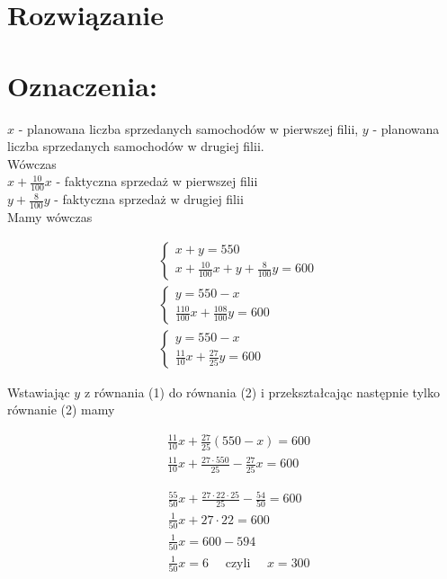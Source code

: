 \documentclass[10pt]{article}
\begin{document}
\section*{Rozwiązanie}
\section*{Oznaczenia:}
\(x\) - planowana liczba sprzedanych samochodów w pierwszej filii, \(y\) - planowana liczba sprzedanych samochodów w drugiej filii.\\
Wówczas\\
\(x+\frac{10}{100} x\) - faktyczna sprzedaż w pierwszej filii\\
\(y+\frac{8}{100} y\) - faktyczna sprzedaż w drugiej filii\\
Mamy wówczas

\[
\begin{aligned}
& \left\{\begin{array}{l}
x+y=550 \\
x+\frac{10}{100} x+y+\frac{8}{100} y=600
\end{array}\right. \\
& \left\{\begin{array}{l}
y=550-x \\
\frac{110}{100} x+\frac{108}{100} y=600
\end{array}\right. \\
& \left\{\begin{array}{l}
y=550-x \\
\frac{11}{10} x+\frac{27}{25} y=600
\end{array}\right.
\end{aligned}
\]

Wstawiając \(y\) z równania (1) do równania (2) i przekształcając następnie tylko równanie (2) mamy

\[
\begin{aligned}
& \frac{11}{10} x+\frac{27}{25}(550-x)=600 \\
& \frac{11}{10} x+\frac{27 \cdot 550}{25}-\frac{27}{25} x=600
\end{aligned}
\]

\[
\begin{aligned}
& \frac{55}{50} x+\frac{27 \cdot 22 \cdot 25}{25}-\frac{54}{50}=600 \\
& \frac{1}{50} x+27 \cdot 22=600 \\
& \frac{1}{50} x=600-594 \\
& \frac{1}{50} x=6 \quad \text { czyli } \quad x=300
\end{aligned}
\]
\end{document}
